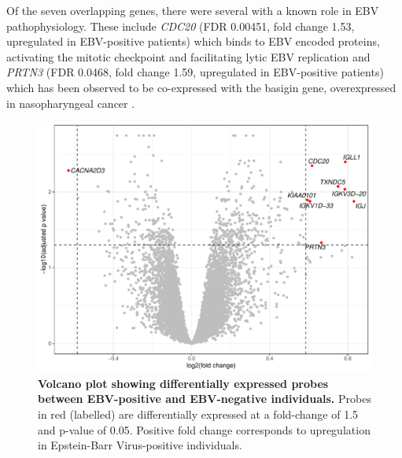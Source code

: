 Of the seven overlapping genes, there were several with a known role in EBV pathophysiology. These include \textit{CDC20} (FDR 0.00451, fold change 1.53, upregulated in EBV-positive patients) which binds to EBV encoded proteins, activating the mitotic checkpoint and facilitating lytic EBV replication \parencite{Li2015} and \textit{PRTN3} (FDR 0.0468, fold change 1.59, upregulated in EBV-positive patients) which has been observed to be co-expressed with the basigin gene, overexpressed in nasopharyngeal cancer \parencite{Gao2017}.

\FloatBarrier
\begin{figure}[htbp]
\centering
\includegraphics[width=\textwidth]{./Results3/Images/ebvsig1.pdf}
\caption[EBV signature]{\textbf{Volcano plot showing differentially expressed probes between EBV-positive and EBV-negative individuals.} Probes in red (labelled) are differentially expressed at a fold-change of 1.5 and p-value of 0.05. Positive fold change corresponds to upregulation in Epstein-Barr Virus-positive individuals.}
\label{fig:ebvsig1}


\end{figure}

